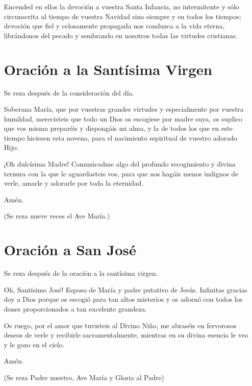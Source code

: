 \documentclass[spanish,utf8,twocolumn]{chlart}
\newenvironment{summary}{\begingroup
	\small\sffamily\itshape%
	\setlength{\leftskip}{3em}\setlength{\rightskip}{3em}\noindent
	}{\par\endgroup}
\newenvironment{lectura}{\begingroup\color{lector}}{\endgroup\par}
\newenvironment{finalnotes}{\begingroup
	\footnotesize\sffamily\color{Gray}%
	\setlength{\leftskip}{3em}\setlength{\rightskip}{3em}\noindent
	}{\par\endgroup}
\begin{document}
\begin{lectura}
Encended en ellos la devoción a vuestra Santa Infancia, no intermitente
y sólo circunscrita al tiempo de vuestra Navidad sino siempre y en todos
los tiempos; devoción que fiel y celosamente propagada nos conduzca a la
vida eterna, librándonos del pecado y sembrando en nosotros todas las
virtudes cristianas.
\end{lectura}
\section{Oración a la Santísima Virgen}
\begin{summary}
Se reza después de la consideración del día.
\end{summary}
\begin{lectura}
Soberana María, que por vuestras grandes virtudes y especialmente por
vuestra humildad, merecisteis que todo un Dios os escogiese por madre
suya, os suplico que vos misma preparéis y dispongáis mi alma, y la de
todos los que en este tiempo hiciesen esta novena, para el nacimiento
espiritual de vuestro adorado Hijo.

¡Oh dulcísima Madre!
Comunicadme algo del profundo recogimiento y divina ternura con la que
le aguardasteis vos, para que nos hagáis menos indignos de verle, amarle
y adorarle por toda la eternidad.

Amén.
\end{lectura}
\begin{finalnotes}
(Se reza nueve veces el Ave María.)
\end{finalnotes}

\section{Oración a San José}
\begin{summary}
Se reza después de la oración a la santísima virgen.
\end{summary}
\begin{lectura}
Oh, Santísimo José!
Esposo de María y padre putativo de Jesús.
Infinitas gracias doy a Dios porque os escogió para tan altos misterios
y os adornó con todos los dones proporcionados a tan excelente grandeza.

Os ruego, por el amor que tuvisteis al Divino Niño, me abraséis en
fervorosos deseos de verle y recibirle sacramentalmente, mientras en su
divina esencia le veo y le gozo en el cielo.

Amén.
\end{lectura}
\begin{finalnotes}
(Se reza Padre nuestro, Ave María y Gloria al Padre)
\end{finalnotes}
\end{document}
